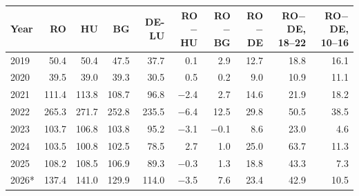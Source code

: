 \begin{tabular}{lrrrrrrrrr}
\toprule
Year & RO & HU & BG & DE-LU & RO$-$HU & RO$-$BG & RO$-$DE & RO$-$DE, 18--22 & RO$-$DE, 10--16 \\
\midrule
2019 & 50.4 & 50.4 & 47.5 & 37.7 & 0.1 & 2.9 & 12.7 & 18.8 & 16.1 \\
2020 & 39.5 & 39.0 & 39.3 & 30.5 & 0.5 & 0.2 & 9.0 & 10.9 & 11.1 \\
2021 & 111.4 & 113.8 & 108.7 & 96.8 & $-$2.4 & 2.7 & 14.6 & 21.9 & 18.2 \\
2022 & 265.3 & 271.7 & 252.8 & 235.5 & $-$6.4 & 12.5 & 29.8 & 50.5 & 38.5 \\
2023 & 103.7 & 106.8 & 103.8 & 95.2 & $-$3.1 & $-$0.1 & 8.6 & 23.0 & 4.6 \\
2024 & 103.5 & 100.8 & 102.5 & 78.5 & 2.7 & 1.0 & 25.0 & 63.7 & 11.3 \\
2025 & 108.2 & 108.5 & 106.9 & 89.3 & $-$0.3 & 1.3 & 18.8 & 43.3 & 7.3 \\
2026* & 137.4 & 141.0 & 129.9 & 114.0 & $-$3.5 & 7.6 & 23.4 & 42.9 & 10.5 \\
\bottomrule
\end{tabular}

